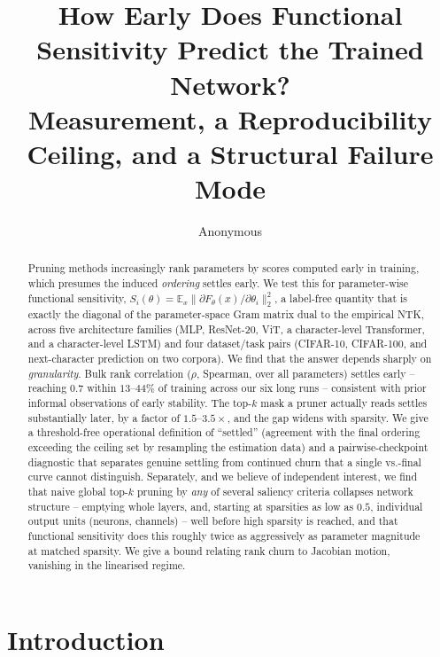 \documentclass{article}
\title{How Early Does Functional Sensitivity Predict the Trained Network?\\
Measurement, a Reproducibility Ceiling, and a Structural Failure Mode}
\author{Anonymous}
\begin{document}
\maketitle

\begin{abstract}
Pruning methods increasingly rank parameters by scores computed early in training, which
presumes the induced \emph{ordering} settles early. We test this for parameter-wise
functional sensitivity, $S_i(\theta)=\mathbb{E}_x\|\partial F_\theta(x)/\partial\theta_i\|_2^2$,
a label-free quantity that is exactly the diagonal of the parameter-space Gram matrix dual
to the empirical NTK, across five architecture families (MLP, ResNet-20, ViT, a
character-level Transformer, and a character-level LSTM) and four dataset/task pairs
(CIFAR-10, CIFAR-100, and next-character prediction on two corpora). We find that the
answer depends sharply on \emph{granularity}. Bulk rank correlation ($\rho$, Spearman, over
all parameters) settles early -- reaching $0.7$ within $13$--$44\%$ of training across our
six long runs -- consistent with prior informal observations of early stability. The top-$k$
mask a pruner actually reads settles substantially later, by a factor of $1.5$--$3.5\times$,
and the gap widens with sparsity. We give a threshold-free operational definition of
``settled'' (agreement with the final ordering exceeding the ceiling set by resampling the
estimation data) and a pairwise-checkpoint diagnostic that separates genuine settling from
continued churn that a single vs.-final curve cannot distinguish. Separately, and we believe
of independent interest, we find that naive global top-$k$ pruning by \emph{any} of several
saliency criteria collapses network structure -- emptying whole layers, and, starting at
sparsities as low as $0.5$, individual output units (neurons, channels) -- well before high
sparsity is reached, and that functional sensitivity does this roughly twice as
aggressively as parameter magnitude at matched sparsity. We give a bound relating rank churn
to Jacobian motion, vanishing in the linearised regime. %
\end{abstract}

\section{Introduction}
\end{document}
